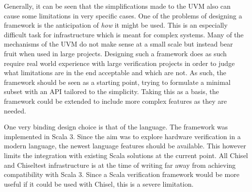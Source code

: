 

Generally, it can be seen that the simplifications made to the UVM also can cause some limitations in very specific cases. One of the problems of designing a framework is the anticipation of \textit{how} it might be used. This is an especially difficult task for infrastructure which is meant for complex systems. Many of the mechanisms of the UVM do not make sense at a small scale but instead bear fruit when used in large projects. Designing such a framework does as such require real world experience with large verification projects in order to judge what limitations are in the end acceptable and which are not. As such, the framework should be seen as a starting point, trying to formulate a minimal subset with an API tailored to the simplicity. Taking this as a basis, the framework could be extended to include more complex features as they are needed.



One very binding design choice is that of the language. The framework was implemented in Scala 3. Since the aim was to explore hardware verification in a modern language, the newest language features should be available. This however limits the integration with existing Scala solutions at the current point. All Chisel and Chiseltest infrastructure is at the time of writing far away from achieving compatibility with Scala 3. Since a Scala verification framework would be more useful if it could be used with Chisel, this is a severe limitation.

